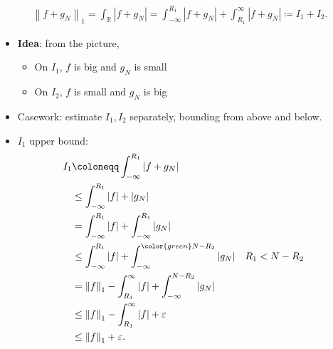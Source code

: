\begin{solution}
\begin{align*}
{\left\lVert {f + g_N} \right\rVert}_1 
= \int_{\mathbb{R}}{\left\lvert {f+g_N} \right\rvert} 
= \int_{-\infty}^{R_1} {\left\lvert {f+ g_N} \right\rvert}
+ \int_{R_1}^{\infty} {\left\lvert {f+ g_N} \right\rvert}
\coloneqq I_1 + I_2
.\end{align*}

\begin{itemize}
\item
  \textbf{Idea}: from the picture,

  \begin{itemize}
  \tightlist
  \item
    On \(I_1\), \(f\) is big and \(g_N\) is small
  \item
    On \(I_2\), \(f\) is small and \(g_N\) is big
  \end{itemize}
\item
  Casework: estimate \(I_1, I_2\) separately, bounding from above and
  below.
\item
  \(I_1\) upper bound:
  \begin{align*}
  I_1 
  &\coloneqq\int_{-\infty}^{R_1} {\left\lvert {f + g_N} \right\rvert} \\
  &\leq \int_{-\infty}^{R_1} {\left\lvert {f} \right\rvert} + {\left\lvert {g_N} \right\rvert} \\
  &= \int_{-\infty}^{R_1} {\left\lvert {f} \right\rvert} + \int_{-\infty}^{R_1} {\left\lvert {g_N} \right\rvert} \\
  &\leq \int_{-\infty}^{R_1} {\left\lvert {f} \right\rvert} + \int_{-\infty}^{\color{green} N - R_2} {\left\lvert {g_N} \right\rvert} && R_1 < N-R_2 \\
  &= {\left\lVert {f} \right\rVert}_1 - \int_{R_1}^{\infty} {\left\lvert {f} \right\rvert} + \int_{-\infty}^{N - R_2} {\left\lvert {g_N} \right\rvert} \\
  &\leq {\left\lVert {f} \right\rVert}_1 - \int_{R_1}^{\infty} {\left\lvert {f} \right\rvert} + {\varepsilon}\\
  &\leq {\left\lVert {f} \right\rVert}_1 + {\varepsilon}
  .\end{align*}


\end{itemize}
\end{solution}
